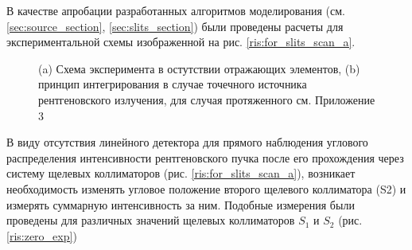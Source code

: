 В качестве апробации разработанных алгоритмов моделирования (см. \ref{sec:source_section}, \ref{sec:slits_section})
были проведены расчеты для экспериментальной схемы изображенной на рис. \ref{ris:for_slits_scan_a}.

\begin{figure}[H]
  \centering
  \hfill
  \caption{ (a) Схема эксперимента в остутствии отражающих элементов, (b) принцип интегрирования в
  случае точечного источника рентгеновского излучения, для случая протяженного см. Приложение 3}
  \label{ris:for_slits_scan}

\end{figure}
В виду отсутствия линейного детектора для прямого наблюдения углового распределения интенсивности рентгеновского
пучка после его прохождения через систему щелевых коллиматоров (рис. \ref{ris:for_slits_scan_a}),
возникает необходимость изменять угловое положение второго щелевого коллиматора (S2) и измерять суммарную интенсивность
за ним. Подобные измерения были проведены для различных значений щелевых коллиматоров $S_1$ и $S_2$ (рис. \ref{ris:zero_exp})

